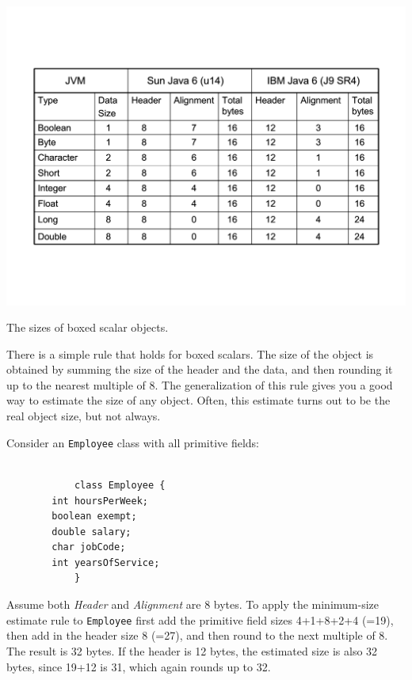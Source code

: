 \begin{table}
  \centering
 \includegraphics[width=.70\textwidth]{Figures/chapter4/boxed-scalar-sizes.pdf}
  \caption{The sizes of boxed scalar objects.}
  \label{tab:boxed-scalar-sizes}
\end{table} 

There is a simple rule that holds for boxed scalars. The size of the object is obtained by summing the size of the header and the data, and then rounding it up to the nearest multiple of 8. The generalization of this rule gives you a good way to estimate the size of any object. Often, this estimate turns out to be the real object size, but not always.
 

\begin{example}
Consider an \texttt{Employee} class with all primitive fields:

\ttfamily
\begin{verbatim} 

			class Employee {
        int hoursPerWeek;
        boolean exempt;
        double salary;
        char jobCode;
        int yearsOfService;
			}
\end{verbatim}
\normalfont
Assume both \textit{Header} and \textit{Alignment} are 8 bytes. To apply the minimum-size estimate rule to \texttt{Employee} first add the primitive field sizes 4+1+8+2+4 (=19), then add in the header size 8 (=27), and then round to the next multiple of 8. The result is 32 bytes.  If the header is 12 bytes, the estimated size is also 32 bytes, since 19+12 is 31, which again rounds up to 32. 
\end{example}

